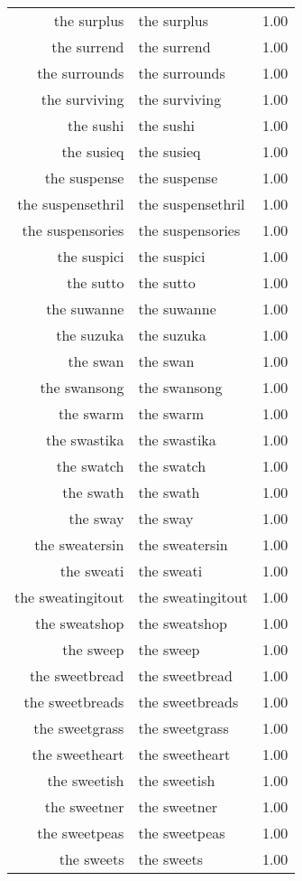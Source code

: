 \begin{table}[ht]
\begin{tabular}{rlr}
  the surplus & the surplus & 1.00 \\ 
  the surrend & the surrend & 1.00 \\ 
  the surrounds & the surrounds & 1.00 \\ 
  the surviving & the surviving & 1.00 \\ 
  the sushi & the sushi & 1.00 \\ 
  the susieq & the susieq & 1.00 \\ 
  the suspense & the suspense & 1.00 \\ 
  the suspensethril & the suspensethril & 1.00 \\ 
  the suspensories & the suspensories & 1.00 \\ 
  the suspici & the suspici & 1.00 \\ 
  the sutto & the sutto & 1.00 \\ 
  the suwanne & the suwanne & 1.00 \\ 
  the suzuka & the suzuka & 1.00 \\ 
  the swan & the swan & 1.00 \\ 
  the swansong & the swansong & 1.00 \\ 
  the swarm & the swarm & 1.00 \\ 
  the swastika & the swastika & 1.00 \\ 
  the swatch & the swatch & 1.00 \\ 
  the swath & the swath & 1.00 \\ 
  the sway & the sway & 1.00 \\ 
  the sweatersin & the sweatersin & 1.00 \\ 
  the sweati & the sweati & 1.00 \\ 
  the sweatingitout & the sweatingitout & 1.00 \\ 
  the sweatshop & the sweatshop & 1.00 \\ 
  the sweep & the sweep & 1.00 \\ 
  the sweetbread & the sweetbread & 1.00 \\ 
  the sweetbreads & the sweetbreads & 1.00 \\ 
  the sweetgrass & the sweetgrass & 1.00 \\ 
  the sweetheart & the sweetheart & 1.00 \\ 
  the sweetish & the sweetish & 1.00 \\ 
  the sweetner & the sweetner & 1.00 \\ 
  the sweetpeas & the sweetpeas & 1.00 \\ 
  the sweets & the sweets & 1.00 \\ 

\end{tabular}
\end{table}
